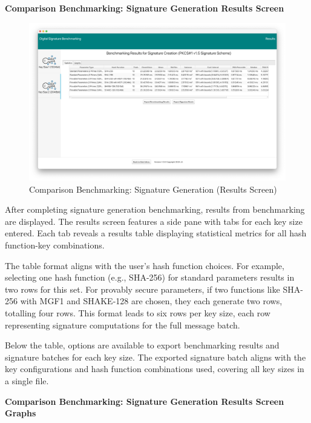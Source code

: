 \documentclass[]{final_report}
\begin{document}
\textbf{Comparison Benchmarking: Signature Generation Results Screen}

\begin{figure}[H]
    \centering
    \includegraphics[scale= 0.325]{main_pictures/ui/signing/signing7-2.png}
   \caption{Comparison Benchmarking: Signature Generation (Results Screen)}
\end{figure}

After completing signature generation benchmarking, results from benchmarking are displayed. The results screen features a side pane with tabs for each key size entered. Each tab reveals a results table displaying statistical metrics for all hash function-key combinations.

The table format aligns with the user's hash function choices. For example, selecting one hash function (e.g., SHA-256) for standard parameters results in two rows for this set. For provably secure parameters, if two functions like SHA-256 with MGF1 and SHAKE-128 are chosen, they each generate two rows, totalling four rows. This format leads to six rows per key size, each row representing signature computations for the full message batch.

Below the table, options are available to export benchmarking results and signature batches for each key size. The exported signature batch aligns with the key configurations and hash function combinations used, covering all key sizes in a single file.

\textbf{Comparison Benchmarking: Signature Generation Results Screen Graphs}
\end{document}
